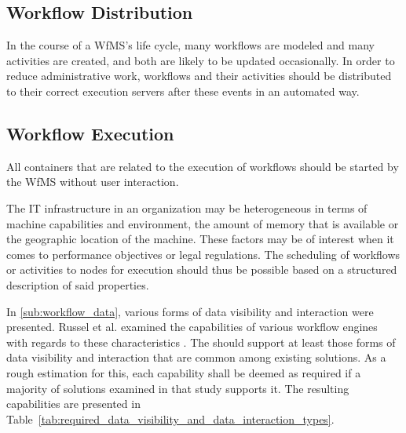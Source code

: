 \subsection*{Workflow Distribution} %
  \label{ssub:workflow_distribution}
    In the course of a \ac{WfMS}'s life cycle, many workflows are modeled and many activities are created, and both are likely to be updated occasionally. In order to reduce administrative work, workflows and their activities should be distributed to their correct execution servers after these events in an automated way.


\subsection*{Workflow Execution} %
  \label{ssub:workflow_execution}
      All containers that are related to the execution of workflows should be started by the \ac{WfMS} without user interaction.

      The IT infrastructure in an organization may be heterogeneous in terms of machine capabilities and environment, \eg the amount of memory that is available or the geographic location of the machine. These factors may be of interest when it comes to performance objectives or legal regulations. The scheduling of workflows or activities to nodes for execution should thus be possible based on a structured description of said properties.

      In \ref{sub:workflow_data}, various forms of data visibility and interaction were presented. Russel et al. examined the capabilities of various workflow engines with regards to these characteristics \cite{Russell2005Workflow}. The should support at least those forms of data visibility and interaction that are common among existing solutions. As a rough estimation for this, each capability shall be deemed as required if a majority of solutions examined in that study supports it. The resulting capabilities are presented in Table~\ref{tab:required_data_visibility_and_data_interaction_types}.


